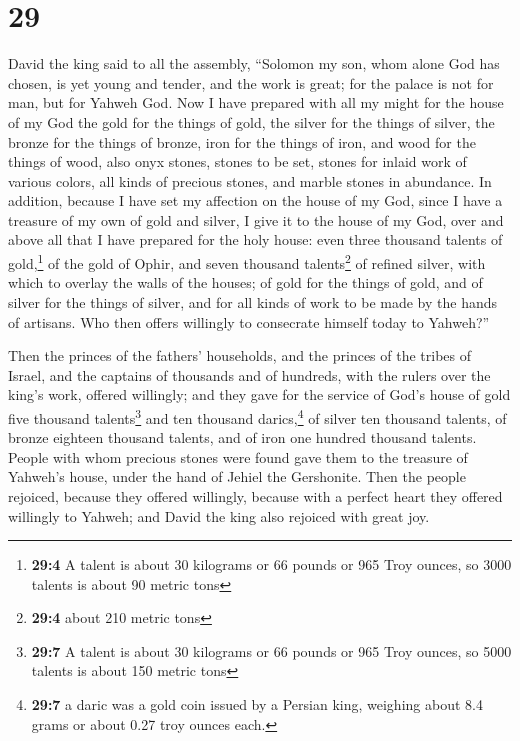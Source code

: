 \hypertarget{section-28}{%
\section{29}\label{section-28}}

 David the king said to all the assembly, ``Solomon my
son, whom alone God has chosen, is yet young and tender, and the work is
great; for the palace is not for man, but for Yahweh God. 
Now I have prepared with all my might for the house of my God the gold
for the things of gold, the silver for the things of silver, the bronze
for the things of bronze, iron for the things of iron, and wood for the
things of wood, also onyx stones, stones to be set, stones for inlaid
work of various colors, all kinds of precious stones, and marble stones
in abundance.  In addition, because I have set my
affection on the house of my God, since I have a treasure of my own of
gold and silver, I give it to the house of my God, over and above all
that I have prepared for the holy house:  even three
thousand talents of gold,\footnote{\textbf{29:4} A talent is about 30
  kilograms or 66 pounds or 965 Troy ounces, so 3000 talents is about 90
  metric tons} of the gold of Ophir, and seven thousand
talents\footnote{\textbf{29:4} about 210 metric tons} of refined silver,
with which to overlay the walls of the houses;  of gold
for the things of gold, and of silver for the things of silver, and for
all kinds of work to be made by the hands of artisans. Who then offers
willingly to consecrate himself today to Yahweh?''

 Then the princes of the fathers' households, and the
princes of the tribes of Israel, and the captains of thousands and of
hundreds, with the rulers over the king's work, offered willingly;
 and they gave for the service of God's house of gold five
thousand talents\footnote{\textbf{29:7} A talent is about 30 kilograms
  or 66 pounds or 965 Troy ounces, so 5000 talents is about 150 metric
  tons} and ten thousand darics,\footnote{\textbf{29:7} a daric was a
  gold coin issued by a Persian king, weighing about 8.4 grams or about
  0.27 troy ounces each.} of silver ten thousand talents, of bronze
eighteen thousand talents, and of iron one hundred thousand talents.
 People with whom precious stones were found gave them to
the treasure of Yahweh's house, under the hand of Jehiel the Gershonite.
 Then the people rejoiced, because they offered willingly,
because with a perfect heart they offered willingly to Yahweh; and David
the king also rejoiced with great joy.

